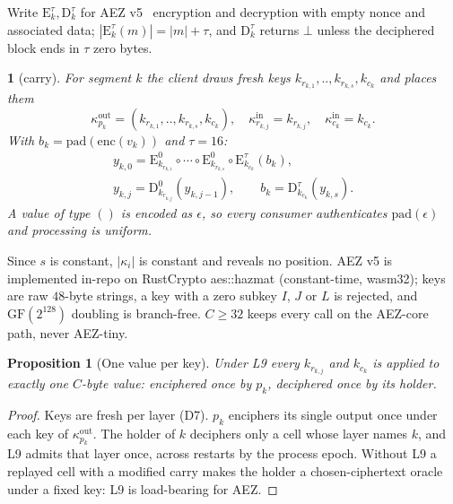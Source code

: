 \documentclass[journal]{IEEEtran}
\newtheorem{proposition}{Proposition}
\newcommand{\namedhead}{}
\newtheorem*{namedenv}{\namedhead}
\newenvironment{defD}[2]{\renewcommand{\namedhead}{Definition #1}%
  \begin{namedenv}[#2]}{\end{namedenv}}
\newcommand{\Enc}[2]{\mathrm{E}^{#1}_{#2}}
\newcommand{\Dec}[2]{\mathrm{D}^{#1}_{#2}}
\newcommand{\pad}{\mathrm{pad}}
\newcommand{\enc}{\mathrm{enc}}
\DeclareRobustCommand{\code}[1]{{\ttfamily\renewcommand{\_}{\textunderscore\allowbreak}#1}}
\begin{document}
Write $\Enc{\tau}{k},\Dec{\tau}{k}$ for AEZ v5~\cite{AEZv5,Hoang2015}
encryption and decryption with empty nonce and associated data;
$|\Enc{\tau}{k}(m)|=|m|+\tau$, and $\Dec{\tau}{k}$ returns $\bot$ unless
the deciphered block ends in $\tau$ zero bytes.

\begin{defD}{D7}{carry}
For segment $k$ the client draws fresh keys
$k_{r_{k,1}},..,k_{r_{k,s}},k_{c_k}$ and places them
\[
\kappa_{p_k}^{\mathrm{out}}=(k_{r_{k,1}},..,k_{r_{k,s}},k_{c_k}),\quad
\kappa_{r_{k,j}}^{\mathrm{in}}=k_{r_{k,j}},\quad
\kappa_{c_k}^{\mathrm{in}}=k_{c_k}.
\]
With $b_k=\pad(\enc(v_k))$ and $\tau=16$:
\begin{gather*}
y_{k,0}=\Enc{0}{k_{r_{k,1}}}\circ\cdots\circ\Enc{0}{k_{r_{k,s}}}
\circ\Enc{\tau}{k_{c_k}}(b_k),\\
y_{k,j}=\Dec{0}{k_{r_{k,j}}}(y_{k,j-1}),\qquad
b_k=\Dec{\tau}{k_{c_k}}(y_{k,s}).
\end{gather*}
A value of type $()$ is encoded as $\epsilon$, so every consumer
authenticates $\pad(\epsilon)$ and processing is uniform.
\end{defD}

Since $s$ is constant, $|\kappa_i|$ is constant and reveals no position.
AEZ v5 is implemented in-repo on RustCrypto \code{aes::hazmat}
(constant-time, \code{wasm32}); keys are raw $48$-byte strings, a key with
a zero subkey $I$, $J$ or $L$ is rejected, and $\mathrm{GF}(2^{128})$
doubling is branch-free.  $C\ge32$ keeps every call on the AEZ-core
path, never AEZ-tiny.

\begin{proposition}[One value per key]\label{prop:onekey}
Under L9 every $k_{r_{k,j}}$ and $k_{c_k}$ is applied to exactly one
$C$-byte value: enciphered once by $p_k$, deciphered once by its holder.
\end{proposition}
\begin{proof}
Keys are fresh per layer (D7).  $p_k$ enciphers its single output once
under each key of $\kappa^{\mathrm{out}}_{p_k}$.  The holder of $k$
deciphers only a cell whose layer names $k$, and L9 admits that layer
once, across restarts by the process epoch.  Without L9 a replayed cell
with a modified carry makes the holder a chosen-ciphertext oracle under a
fixed key: L9 is load-bearing for AEZ.
\end{proof}
\end{document}
